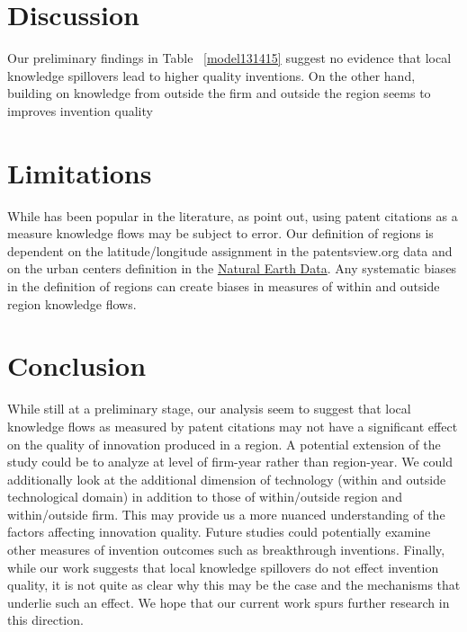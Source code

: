 \documentclass[12pt]{article}
\begin{document}
\section*{Discussion}
Our preliminary findings in Table ~\ref{model131415} suggest no evidence that local knowledge spillovers lead to higher quality inventions. On the other hand, building on knowledge from outside the firm and outside the region seems to improves invention quality

\section*{Limitations}
While has been popular in the literature, as \cite{Arora2017} point out, using patent citations as a measure knowledge flows may be subject to error. Our definition of regions is dependent on the latitude/longitude assignment in the patentsview.org data and on the urban centers definition in the \href{http://www.naturalearthdata.com/downloads/10m-cultural-vectors/}{Natural Earth Data}. Any systematic biases in the definition of regions can create biases in measures of within and outside region knowledge flows. 


\section*{Conclusion}
While still at a preliminary stage, our analysis seem to suggest that local knowledge flows as measured by patent citations may not have a significant effect on the quality of innovation produced in a region. A potential extension of the study could be to analyze at level of firm-year rather than region-year. We could additionally look at the additional dimension of technology (within and outside technological domain) in addition to those of within/outside region and within/outside firm. This may provide us a more nuanced understanding of the factors affecting innovation quality. Future studies could potentially examine other measures of invention outcomes such as breakthrough inventions. Finally, while our work suggests that local knowledge spillovers do not effect invention quality, it is not quite as clear why this may be the case and the mechanisms that underlie such an effect. We hope that our current work spurs further research in this direction.  

\begin{landscape}
\begin{centering}

\end{centering}
\end{landscape}
\end{document}

